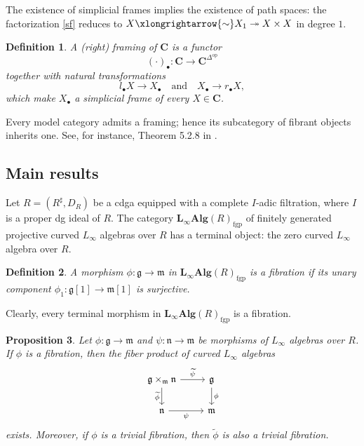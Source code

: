 \documentclass[12pt]{amsart}
\newtheorem{defn}{Definition}[section]
\newtheorem{prop}[defn]{Proposition}
\numberwithin{equation}{section}
\theoremstyle{plain}
\newcommand{\bfC}{\mathbf{C}}
\newcommand{\fg}{\mathfrak{g}}
\newcommand{\fm}{\mathfrak{m}}
\newcommand{\fn}{\mathfrak{n}}
\newcommand{\uR}{{R^\sharp}}
\begin{document}
	The existence of simplicial frames implies the existence of path spaces: the factorization \eqref{sf} reduces to $X \xlongrightarrow{\sim} X_1 \twoheadrightarrow X \times X$ in degree $1$.
	
	\begin{defn}
		A \emph{(right) framing} of $\bfC$ is a functor
		\[
		(\cdot)_\bullet\colon \bfC \longrightarrow \bfC^{\Delta^{\mathrm{op}}}
		\]
		together with natural transformations
		\[
		l_\bullet X \longrightarrow X_\bullet  \quad\text{and}\quad X_\bullet \longrightarrow r_\bullet X,
		\]
		which make $X_\bullet$ a simplicial frame of every $X \in \bfC$. 
	\end{defn}

	Every model category admits a framing; hence its subcategory of fibrant objects inherits one. See, for instance, Theorem 5.2.8 in \cite{hovey2007model}.

	\subsection{Main results}
	
	Let $R = (\uR, D_R)$ be a cdga equipped with a complete $I$-adic filtration, where $I$ is a proper dg ideal of $R$. The category $\mathbf{L_\infty Alg}(R)_{\mathrm{fgp}}$ of finitely generated projective curved $L_\infty$ algebras over $R$ has a terminal object: the zero curved $L_\infty$ algebra over $R$.
	
	\begin{defn}
		A morphism $\phi\colon \fg \rightarrow \fm$ in $\mathbf{L_\infty Alg}(R)_{\mathrm{fgp}}$ is a \emph{fibration} if its unary component $\phi_1\colon \fg[1] \rightarrow \fm[1]$ is surjective.
	\end{defn}
	
	Clearly, every terminal morphism in $\mathbf{L_\infty Alg}(R)_{\mathrm{fgp}}$  is a fibration.
	
	\begin{prop}\label{pullback}
		Let $\phi\colon \fg \rightarrow \fm$ and $\psi\colon \fn \rightarrow \fm$ be morphisms of $L_\infty$ algebras over $R$. If $\phi$ is a fibration, then the fiber product of curved $L_\infty$ algebras 
		\[
		\begin{tikzcd}
			\fg \times_\fm \fn \arrow[r,"\widetilde{\psi}"] \arrow[d,"\widetilde{\phi}"'] & \fg \arrow[d,"\phi"] \\
			\fn \arrow[r,"\psi"'] & \fm
		\end{tikzcd}
		\]
		exists. Moreover, if $\phi$ is a trivial fibration, then $\widetilde{\phi}$ is also a trivial fibration.
	\end{prop}
	
\end{document}
